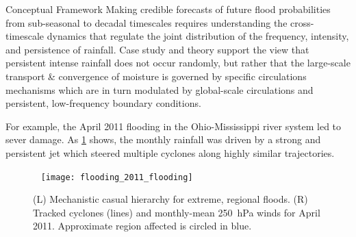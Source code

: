 \begin{block}{Conceptual Framework}
    Making credible forecasts of future flood probabilities from sub-seasonal to decadal timescales \cite{Merz2014} requires understanding the cross-timescale dynamics that regulate the joint distribution of the frequency, intensity, and persistence of rainfall.
    Case study \cite[\ie][]{Grams2014} and theory support the view that persistent intense rainfall does not occur randomly, but rather that the large-scale transport \& convergence of moisture is governed by specific circulations mechanisms which are in turn modulated by global-scale circulations and persistent, low-frequency boundary conditions.

    For example, the April 2011 flooding in the Ohio-Mississippi river system led to sever damage.
    As \cref{fig:apr2011} shows, the monthly rainfall was driven by a strong and persistent jet which steered multiple cyclones along highly similar trajectories.
    \begin{figure}
        ~\hfill
        \texttt{[image: flooding\_2011\_flooding]}
        \caption{(L) Mechanistic casual hierarchy for extreme, regional floods. (R) Tracked cyclones (lines) and monthly-mean \SI{250}{\hecto\pascal} winds for April 2011. Approximate region affected is circled in blue.}
        \label{fig:apr2011}
    \end{figure}
\end{block}
